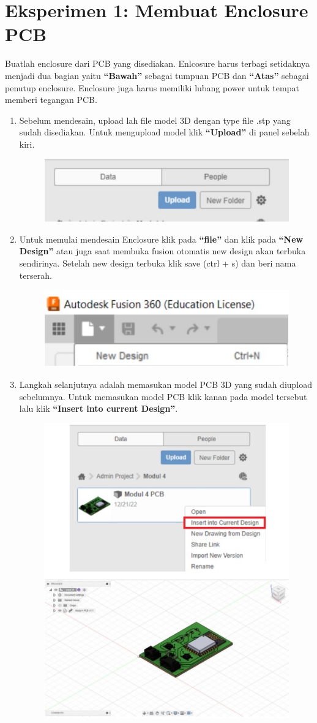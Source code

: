 \section{Eksperimen 1: Membuat Enclosure PCB}
Buatlah enclosure dari PCB yang disediakan. Enlcosure harus terbagi setidaknya menjadi dua bagian yaitu
\textbf{“Bawah”} sebagai tumpuan PCB dan \textbf{“Atas”} sebagai penutup enclosure. Enclosure juga harus memiliki
lubang power untuk tempat memberi tegangan PCB.

\begin{enumerate}
    \item Sebelum mendesain, upload lah file model 3D dengan type file .stp yang sudah disediakan. Untuk
    mengupload model klik \textbf{“Upload”} di panel sebelah kiri.
        \begin{figure}[H]
            \centering
            \includegraphics[width=0.5\linewidth]{P3/img/image3.jpg}
        \end{figure}

    \item Untuk memulai mendesain Enclosure klik pada \textbf{“file”} dan klik pada \textbf{“New Design”} atau juga saat
    membuka fusion otomatis new design akan terbuka sendirinya. Setelah new design terbuka klik
    save (ctrl + s) dan beri nama terserah.
        \begin{figure}[H]
            \centering
            \includegraphics[width=0.5\linewidth]{P3/img/image4.jpg}
        \end{figure}

    \item Langkah selanjutnya adalah memasukan model PCB 3D yang sudah diupload sebelumnya. Untuk
    memasukan model PCB klik kanan pada model tersebut lalu klik \textbf{“Insert into current Design”}.
        \begin{figure}[H]
            \centering
            \includegraphics[width=0.5\linewidth]{P3/img/image5.jpg}
        \end{figure}


\end{enumerate}

